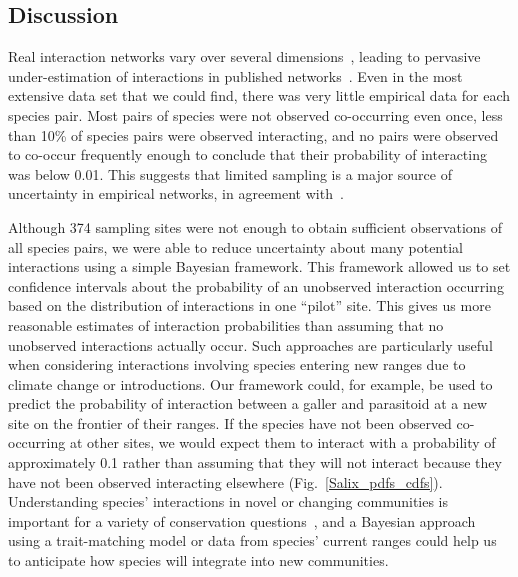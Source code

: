 \documentclass[12pt]{article}
\begin{document}
\begin{spacing}{2.0}

\section*{Discussion}


  Real interaction networks vary over several dimensions~\citep{Kitching1987,Olesen2011a,Pires2011a,Baiser2012,Fodrie2015,Novak2015}, leading to pervasive under-estimation of interactions in published networks~\citep{Jordano2016}. Even in the most extensive data set that we could find, there was very little empirical data for each species pair. Most pairs of species were not observed co-occurring even once, less than 10\% of species pairs were observed interacting, and no pairs were observed to co-occur frequently enough to conclude that their probability of interacting was below 0.01. This suggests that limited sampling is a major source of uncertainty in empirical networks, in agreement with~\citet{Jordano2016,Weinstein2017a}. 


  Although 374 sampling sites were not enough to obtain sufficient observations of all species pairs, we were able to reduce uncertainty about many potential interactions using a simple Bayesian framework. This framework allowed us to set confidence intervals about the probability of an unobserved interaction occurring based on the distribution of interactions in one ``pilot'' site. This gives us more reasonable estimates of interaction probabilities than assuming that no unobserved interactions actually occur. Such approaches are particularly useful when considering interactions involving species entering new ranges due to climate change or introductions. Our framework could, for example, be used to predict the probability of interaction between a galler and parasitoid at a new site on the frontier of their ranges. If the species have not been observed co-occurring at other sites, we would expect them to interact with a probability of approximately 0.1 rather than assuming that they will not interact because they have not been observed interacting elsewhere (Fig.~\ref{Salix_pdfs_cdfs}). Understanding species' interactions in novel or changing communities is important for a variety of conservation questions~\citep{Bartomeus2013,Gravel2013}, and a Bayesian approach using a trait-matching model or data from species' current ranges could help us to anticipate how species will integrate into new communities. 



\end{spacing}
\end{document}
